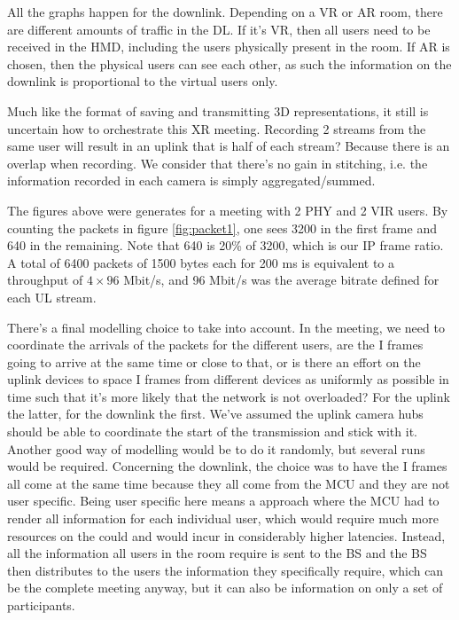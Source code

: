 

All the graphs happen for the downlink. Depending on a VR or AR room, there are different amounts of traffic in the DL. If it's VR, then all users need to be received in the \acs{HMD}, including the users physically present in the room. If AR is chosen, then the physical users can see each other, as such the information on the downlink is proportional to the virtual users only.

Much like the format of saving and transmitting 3D representations, it still is uncertain how to orchestrate this XR meeting. Recording 2 streams from the same user will result in an uplink that is half of each stream? Because there is an overlap when recording. We consider that there's no gain in stitching, i.e. the information recorded in each camera is simply aggregated/summed. 


The figures above were generates for a meeting with 2 PHY and 2 VIR users. By counting the packets in figure \ref{fig:packet1}, one sees 3200 in the first frame and 640 in the remaining. Note that 640 is 20\% of 3200, which is our IP frame ratio. A total of 6400 packets of 1500 bytes each for 200 ms is equivalent to a throughput of $4 \times 96$ Mbit/s, and 96 Mbit/s was the average bitrate defined for each UL stream.



There's a final modelling choice to take into account. In the meeting, we need to coordinate the arrivals of the packets for the different users, are the I frames going to arrive at the same time or close to that, or is there an effort on the uplink devices to space I frames from different devices as uniformly as possible in time such that it's more likely that the network is not overloaded? For the uplink the latter, for the downlink the first. We've assumed the uplink camera hubs should be able to coordinate the start of the transmission and stick with it. Another good way of modelling would be to do it randomly, but several runs would be required. Concerning the downlink, the choice was to have the I frames all come at the same time because they all come from the MCU and they are not user specific. Being user specific here means a  approach where the \acs{MCU} had to render all information  for each individual user, which would require much more resources on the could and would incur in considerably higher latencies. Instead, all the information all users in the room require is sent to the BS and the BS then distributes to the users the information they specifically require, which can be the complete meeting anyway, but it can also be information on only a set of participants. 






